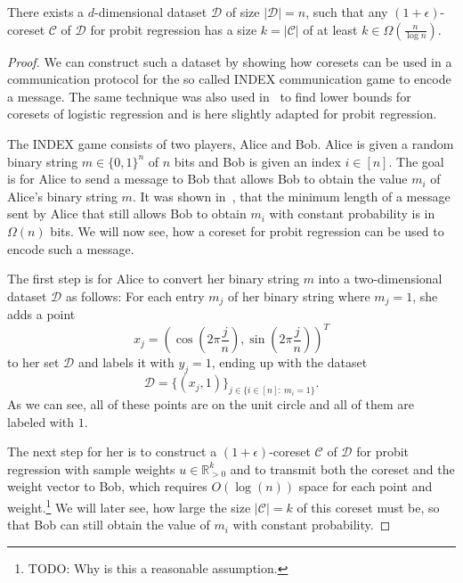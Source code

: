 \begin{theorem}
    \label{theorem:index}
    There exists a $d$-dimensional dataset $\mathcal{D}$ of size
    $|\mathcal{D}| = n$, such
    that any $(1+\epsilon)$-coreset $\mathcal{C}$ of $\mathcal{D}$
    for probit regression has a size $k = |\mathcal{C}|$
    of at least $k \in \Omega\left(\frac{n}{\log{n}}\right)$.
\end{theorem}
\begin{proof}
    We can construct such a  dataset by showing
    how coresets can be used in a
    communication protocol for the so called INDEX communication game
    to encode a message.
    The same technique was also used in~\cite{on-coresets} to find
    lower bounds for coresets of logistic regression and is here slightly
    adapted for probit regression.

    The INDEX game consists of two players, Alice and Bob.
    Alice is given a random binary string $m \in \{0, 1\}^n$ of $n$ bits
    and Bob is given an index $i \in [n]$.
    The goal is for Alice to send a message to Bob that allows
    Bob to obtain the value $m_i$ of Alice's binary string $m$.
    It was shown in~\cite{index}, that the minimum length of a message
    sent by Alice that still allows Bob to obtain $m_i$ with
    constant probability is in $\Omega(n)$ bits.
    We will now see, how a coreset for probit regression can be used
    to encode such a message.

    The first step is for Alice to convert her binary string $m$ into
    a two-dimensional dataset $\mathcal{D}$ as follows:
    For each entry $m_j$ of her binary string where $m_j = 1$, she adds
    a point
    \begin{equation*}
        x_j = \left( \cos{\left(2 \pi \frac{j}{n}\right)},
        \sin{\left(2 \pi \frac{j}{n}\right)} \right)^T
    \end{equation*}
    to her set $\mathcal{D}$ and labels it with $y_j = 1$,
    ending up with the dataset
    \begin{equation*}
        \mathcal{D} = \{(x_j, 1)\}_{j \in \{i \in [n]:\ m_i = 1 \}}.
    \end{equation*}
    As we can see, all of these points are on the unit circle and all
    of them are labeled with $1$.

    The next step for her is to construct a
    $(1+\epsilon)$-coreset $\mathcal{C}$ of $\mathcal{D}$
    for probit regression with sample weights $u \in \mathbb{R}^k_{>0}$
    and to transmit both the coreset and the weight vector to Bob,
    which requires $O(\log(n))$ space for each point and
    weight.\footnote{TODO: Why is this a reasonable assumption.}
    We will later see, how
    large the size $|\mathcal{C}|=k$ of this coreset must be,
    so that Bob can still
    obtain the value of $m_i$ with constant probability.


\end{proof}
